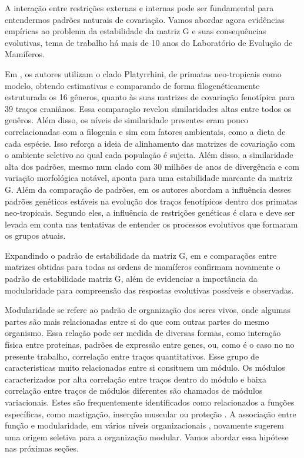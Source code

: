 A interação entre restrições externas e internas pode ser fundamental
para entendermos padrões naturais de covariação. 
Vamos abordar agora evidências empíricas ao problema da estabilidade da
matriz G e suas consequências evolutivas, tema de trabalho há mais de 10
anos do Laboratório de Evolução de Mamíferos.

Em \cite{Marroig2001}, os autores utilizam o clado Platyrrhini, de
primatas neo-tropicais como modelo, obtendo estimativas e comparando de
forma filogenéticamente estruturada os 16 gêneros, quanto às suas
matrizes de covariação fenotípica para 39 traços craniânos. 
Essa comparação revelou similaridades altas entre todos os genêros. 
Além disso, os níveis de similaridade presentes eram pouco
correlacionadas com a filogenia e sim com fatores ambientais, como a
dieta de cada espécie. 
Isso reforça a ideia de alinhamento das matrizes de covariação com o
ambiente seletivo ao qual cada população é sujeita. 
Além disso, a similaridade alta dos padrões, mesmo num clado com 30
milhões de anos de divergência e com variação morfológica notável,
aponta para uma estabilidade marcante da matriz G. 
Além da comparação de padrões, em \cite{Marroig2005, Marroig2010} os
autores abordam a influência desses padrões genéticos estáveis na
evolução dos traços fenotípicos dentro dos primatas neo-tropicais. 
Segundo eles, a influência de restrições genéticas é clara e deve ser
levada em conta nas tentativas de entender os processos evolutivos que
formaram os grupos atuais.

Expandindo o padrão de estabilidade da matriz G, em \cite{Porto2008} e
\cite{Marroig2009} comparações entre matrizes obtidas para todas as
ordens de mamíferos confirmam novamente o padrão de estabilidade matriz
G, além de evidenciar a importância da modularidade para compreensão das
respostas evolutivas possíveis e observadas. 


Modularidade se refere ao padrão de organização dos seres vivos, onde
algumas partes são mais relacionadas entre si do que com outras partes
do mesmo organismo. 
Essa relação pode ser medida de diversas formas, como interação física
entre proteinas, padrões de expressão entre genes, ou, como é o caso no
no presente trabalho, correlação entre traços quantitativos. 
Esse grupo de caracteristicas muito relacionadas entre si consituem um
módulo. 
Os módulos caracterizados por alta correlação entre traços dentro do
módulo e baixa correlação entre traços de módulos diferentes são
chamados de módulos variacionais. 
Estes são frequentemente identificados como relacionados a funções
específicas, como mastigação, inserção muscular ou proteção
\citep{Cheverud1997}. 
A associação entre função e modularidade, em vários níveis
organizacionais \citep{Costanzo2010}, novamente sugerem uma origem
seletiva para a organização modular. 
Vamos abordar essa hipótese nas próximas seções.

